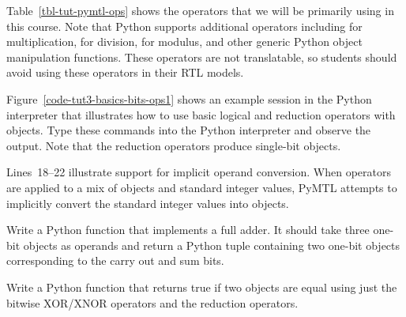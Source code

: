 \documentclass{cbxdoc}
\begin{document}
Table~\ref{tbl-tut-pymtl-ops} shows the  operators that we will
be primarily using in this course. Note that Python supports additional
operators including \TT{*} for multiplication, \TT{/} for division,
\TT{\%} for modulus, and other generic Python object manipulation
functions. These operators are not translatable, so students should avoid
using these operators in their RTL models.

\clearpage



\begin{minipage}[t]{0.51\tw}
\setlength{\parskip}{0.5em}

  Figure~\ref{code-tut3-basics-bits-ops1} shows an example session in the
  Python interpreter that illustrates how to use basic logical and
  reduction operators with  objects. Type these commands into
  the Python interpreter and observe the output. Note that the reduction
  operators produce single-bit  objects.

  Lines~18--22 illustrate support for implicit operand conversion. When
  operators are applied to a mix of  objects and standard
  integer values, PyMTL attempts to implicitly convert the standard
  integer values into  objects.

  \begin{task}
    Write a Python function that implements a full adder. It should take
    three one-bit  objects as operands and return a Python tuple
    containing two one-bit  objects corresponding to the carry
    out and sum bits.

    Write a Python function that returns true if two  objects
    are equal using just the bitwise XOR/XNOR operators and the reduction
    operators.
  \end{task}

\end{minipage}
\hfill
\begin{minipage}[t]{0.46\tw}
  \vspace{-0.2in}

  
\end{minipage}

\clearpage
\end{document}
